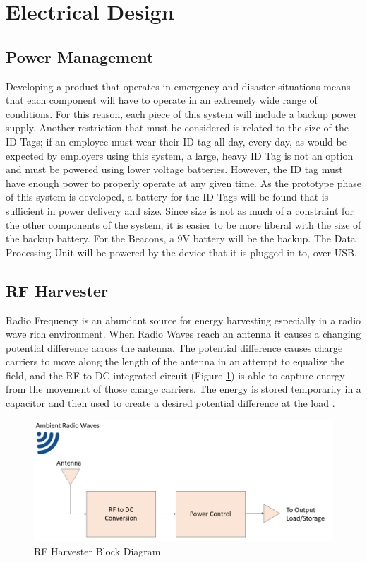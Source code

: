 

\setcounter{section}{4}
\section{Electrical Design}
\bigskip

\subsection{Power Management}
\medskip
Developing a product that operates in emergency and disaster situations means that each component will have to operate in an extremely wide range of conditions. For this reason, each piece of this system will include a backup power supply. Another restriction that must be considered is related to the size of the ID Tags; if an employee must wear their ID tag all day, every day, as would be expected by employers using this system, a large, heavy ID Tag is not an option and must be powered using lower voltage batteries. However, the ID tag must have enough power to properly operate at any given time. As the prototype phase of this system is developed, a battery for the ID Tags will be found that is sufficient in power delivery and size. Since size is not as much of a constraint for the other components of the system, it is easier to be more liberal with the size of the backup battery. For the Beacons, a 9V battery will be the backup. The Data Processing Unit will be powered by the device that it is plugged in to, over USB.

\pagebreak
\subsection{RF Harvester}
\medskip
Radio Frequency is an abundant source for energy harvesting especially in a radio wave rich environment. When Radio Waves reach an antenna it causes a changing potential difference across the antenna. The potential difference causes charge carriers to move along the length of the antenna in an attempt to equalize the field, and the RF-to-DC integrated circuit (Figure \ref{rf_bd}) is able to capture energy from the movement of those charge carriers. The energy is stored temporarily in a capacitor and then used to create a desired potential difference at the load \cite{R5-2-1}.

\medskip
\begin{figure}[H]
\centering
    \includegraphics[scale=0.55]{./images/RF_H.png}
    \caption{RF Harvester Block Diagram}
    \label{rf_bd}
\end{figure}

